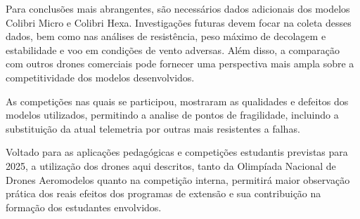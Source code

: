 \documentclass[conference]{IEEEtran}
\begin{document}
Para conclusões mais abrangentes, são necessários dados adicionais dos modelos Colibri Micro e Colibri Hexa. Investigações futuras devem focar na coleta desses dados, bem como nas análises de resistência, peso máximo de decolagem e estabilidade e voo em condições de vento adversas. Além disso, a comparação com outros drones comerciais pode fornecer uma perspectiva mais ampla sobre a competitividade dos modelos desenvolvidos.

As competições nas quais se participou, mostraram as qualidades e defeitos dos modelos utilizados,  permitindo a analise de pontos de fragilidade, incluindo a substituição da atual telemetria por outras mais resistentes a falhas.

Voltado para as aplicações pedagógicas e competições estudantis previstas para 2025, a utilização dos drones aqui descritos, tanto da Olimpíada Nacional de Drones Aeromodelos quanto na competição interna, permitirá maior observação prática dos reais efeitos dos programas de extensão e sua contribuição na formação dos estudantes envolvidos.
\end{document}
